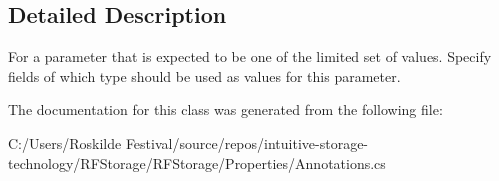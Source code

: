 \subsection{Detailed Description}
For a parameter that is expected to be one of the limited set of values. Specify fields of which type should be used as values for this parameter. 



The documentation for this class was generated from the following file\+:\begin{DoxyCompactItemize}
\item 
C\+:/\+Users/\+Roskilde Festival/source/repos/intuitive-\/storage-\/technology/\+R\+F\+Storage/\+R\+F\+Storage/\+Properties/Annotations.\+cs\end{DoxyCompactItemize}

